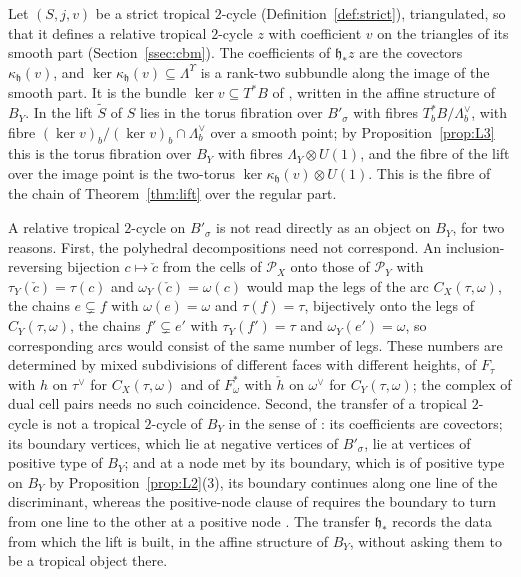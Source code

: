 \begin{remark}\label{rem:CBMfibre}
Let $(S,j,v)$ be a strict tropical $2$-cycle (Definition~\ref{def:strict}), triangulated, so that it defines a relative
tropical $2$-cycle $z$ with coefficient $v$ on the triangles of its smooth part (Section~\ref{ssec:cbm}). The coefficients
of $\mathfrak h_*z$ are the covectors $\kappa_{\mathfrak h}(v)$, and $\ker\kappa_{\mathfrak h}(v)\subseteq\Lambda^\Upsilon$ is a rank-two subbundle along the image of
the smooth part. It is the bundle $\ker v\subseteq T^*B$ of \cite[Def.~7.2]{CBM}, written in the affine structure of $B_Y$.
In \cite[\S7]{CBM} the lift $\widetilde S$ of $S$ lies in the torus fibration over $B'_\sigma$ with fibres
$T^*_bB/\Lambda^\vee_b$, with fibre $(\ker v)_b/(\ker v)_b\cap\Lambda^\vee_b$ over a smooth point; by
Proposition~\ref{prop:L3} this is the torus fibration over $B_Y$ with fibres $\Lambda_Y\otimes U(1)$, and the fibre of the
lift over the image point is the two-torus $\ker\kappa_{\mathfrak h}(v)\otimes U(1)$. This is the fibre of the chain of
Theorem~\ref{thm:lift} over the regular part.
\end{remark}

\begin{remark}\label{rem:mismatch}
A relative tropical $2$-cycle on $B'_\sigma$ is not read directly as an object on $B_Y$, for two reasons. First, the
polyhedral decompositions need not correspond. An inclusion-reversing bijection $c\mapsto\check
c$ from the cells of $\mathscr P_X$ onto those of $\mathscr P_Y$ with $\tau_Y(\check c)=\tau(c)$ and $\omega_Y(\check
c)=\omega(c)$ would map the legs of the arc $C_X(\tau,\omega)$, the chains $e\subsetneq f$ with $\omega(e)=\omega$ and
$\tau(f)=\tau$, bijectively onto the legs of $C_Y(\tau,\omega)$, the chains $f'\subsetneq e'$ with $\tau_Y(f')=\tau$ and
$\omega_Y(e')=\omega$, so corresponding arcs would consist of the same number of legs. These numbers are determined by
mixed subdivisions of different faces with different heights, of $F_\tau$ with $h$ on $\tau^\vee$ for $C_X(\tau,\omega)$
and of $F^*_\omega$ with $\check h$ on $\omega^\vee$ for $C_Y(\tau,\omega)$; the complex of dual cell pairs needs no such
coincidence. Second, the transfer of a tropical $2$-cycle is not a tropical $2$-cycle of $B_Y$ in the sense of \cite[Def.~7.2]{CBM}: its coefficients are covectors; its boundary
vertices, which lie at negative vertices of $B'_\sigma$, lie at vertices of positive type of $B_Y$; and at a node met by its
boundary, which is of positive type on $B_Y$ by Proposition~\ref{prop:L2}(3), its boundary continues along one line of the
discriminant, whereas the positive-node clause of \cite[Def.~7.2]{CBM} requires the boundary to turn from one line to the other at a positive node
\cite[Fig.~14(3)]{CBM}. The transfer $\mathfrak h_*$ records the data from which the lift is built, in the affine structure of $B_Y$,
without asking them to be a tropical object there.
\end{remark}
